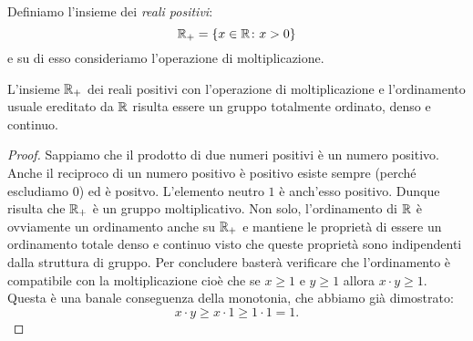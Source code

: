 
Definiamo l'insieme dei \emph{reali positivi}:
\[
{\mathbb R}_+ = {\left\{ x\in {\mathbb R}\colon x>0 \right\}}
\]
e su di esso consideriamo l'operazione di moltiplicazione.

\begin{theorem}
  \label{th:gruppo_moltiplicativo}%
L'insieme ${\mathbb R}_+$ dei reali positivi con l'operazione di moltiplicazione 
e l'ordinamento usuale ereditato da ${\mathbb R}$ risulta essere 
un gruppo totalmente ordinato, denso e continuo.
\end{theorem}
%
\begin{proof}
Sappiamo che il prodotto di due numeri positivi 
è un numero positivo. Anche il reciproco di un numero positivo è positivo 
esiste sempre (perché escludiamo $0$) ed è positvo. 
L'elemento neutro $1$ è anch'esso positivo. 
Dunque risulta che ${\mathbb R}_+$ è un gruppo moltiplicativo.
Non solo, l'ordinamento di ${\mathbb R}$ è ovviamente un ordinamento anche su ${\mathbb R}_+$
e mantiene le proprietà di essere un ordinamento totale 
denso e continuo visto che queste proprietà sono indipendenti dalla struttura di gruppo.
Per concludere basterà verificare che l'ordinamento è compatibile con la moltiplicazione
cioè che se $x\ge 1$ e $y\ge 1$ allora $x\cdot y\ge 1$. 
Questa è una banale conseguenza della monotonia, che abbiamo già dimostrato:
\[
 x\cdot y \ge x\cdot 1 \ge 1\cdot 1 = 1.  
\]
\end{proof}

